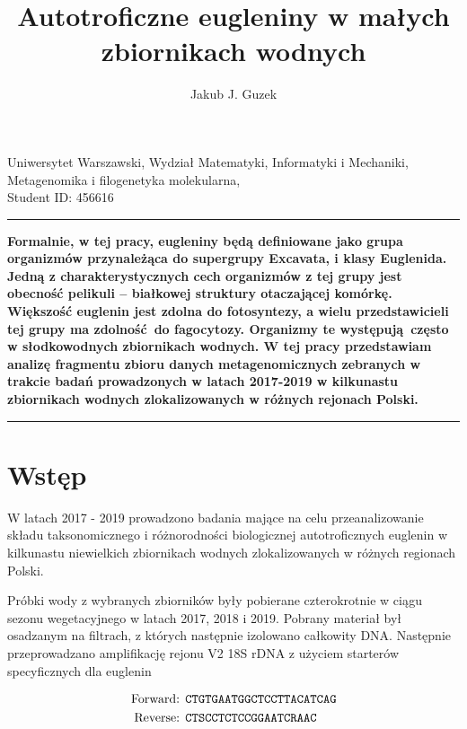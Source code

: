 \documentclass[two column, twoside, a4paper]{article}
\title{Autotroficzne eugleniny w małych zbiornikach wodnych}
\author{Jakub J. Guzek}
\newcommand{\subjectname}{Metagenomika i filogenetyka molekularna}
\newcommand{\faculty}{Wydział Matematyki, Informatyki i Mechaniki}
\newcommand{\institution}{Uniwersytet Warszawski}
\begin{document}
\begin{strip}
  {\bfseries \LARGE {}\selectfont \thetitle} \vspace{\baselineskip}

	{\bfseries \large \theauthor}

	{\institution, \faculty, \subjectname, \\ Student ID: 456616}\vspace{\baselineskip}

	\hrule\vspace{\baselineskip}

	\textbf{\textsf{
    Formalnie, w tej pracy, eugleniny będą definiowane jako grupa organizmów przynależąca do supergrupy Excavata, i klasy Euglenida. Jedną z charakterystycznych cech organizmów z tej grupy jest obecność pelikuli -- białkowej struktury otaczającej komórkę. Większość euglenin jest zdolna do fotosyntezy, a wielu przedstawicieli tej grupy ma zdolność do fagocytozy. Organizmy te występują często w słodkowodnych zbiornikach wodnych. W tej pracy przedstawiam analizę fragmentu zbioru danych metagenomicznych zebranych w trakcie badań prowadzonych w latach 2017-2019 w kilkunastu zbiornikach wodnych zlokalizowanych w różnych rejonach Polski.
  }}
	\vspace{\baselineskip}

	\hrule

\end{strip}

\section{Wstęp}

W latach 2017 - 2019 prowadzono badania mające na celu przeanalizowanie składu taksonomicznego i
różnorodności biologicznej autotroficznych euglenin w kilkunastu niewielkich zbiornikach wodnych
zlokalizowanych w różnych regionach Polski.

Próbki wody z wybranych zbiorników były pobierane czterokrotnie w ciągu sezonu wegetacyjnego w latach
2017, 2018 i 2019. Pobrany materiał był osadzanym na filtrach, z których następnie izolowano całkowity DNA.
Następnie przeprowadzano amplifikację rejonu V2 18S rDNA z użyciem starterów specyficznych dla euglenin

\begin{align*}
  \text{Forward: } & \text{\texttt{CTGTGAATGGCTCCTTACATCAG}} \\
  \text{Reverse: } & \text{\texttt{CTSCCTCTCCGGAATCRAAC}}
\end{align*}
\end{document}
